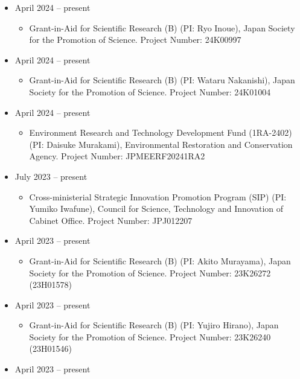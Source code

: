 \documentclass[
]{book}
\providecommand{\tightlist}{%
  \setlength{\itemsep}{0pt}\setlength{\parskip}{0pt}}
\begin{document}
\begin{itemize}
\tightlist
\item
  April 2024 -- present

  \begin{itemize}
  \tightlist
  \item
    Grant-in-Aid for Scientific Research (B) (PI: Ryo Inoue),
    Japan Society for the Promotion of Science.
    Project Number: 24K00997
  \end{itemize}
\item
  April 2024 -- present

  \begin{itemize}
  \tightlist
  \item
    Grant-in-Aid for Scientific Research (B) (PI: Wataru Nakanishi),
    Japan Society for the Promotion of Science.
    Project Number: 24K01004
  \end{itemize}
\item
  April 2024 -- present

  \begin{itemize}
  \tightlist
  \item
    Environment Research and Technology Development Fund (1RA-2402) (PI: Daisuke Murakami),
    Environmental Restoration and Conservation Agency.
    Project Number: JPMEERF20241RA2
  \end{itemize}
\item
  July 2023 -- present

  \begin{itemize}
  \tightlist
  \item
    Cross-ministerial Strategic Innovation Promotion Program (SIP) (PI: Yumiko Iwafune),
    Council for Science, Technology and Innovation of Cabinet Office.
    Project Number: JPJ012207
  \end{itemize}
\item
  April 2023 -- present

  \begin{itemize}
  \tightlist
  \item
    Grant-in-Aid for Scientific Research (B) (PI: Akito Murayama),
    Japan Society for the Promotion of Science.
    Project Number: 23K26272 (23H01578)
  \end{itemize}
\item
  April 2023 -- present

  \begin{itemize}
  \tightlist
  \item
    Grant-in-Aid for Scientific Research (B) (PI: Yujiro Hirano),
    Japan Society for the Promotion of Science.
    Project Number: 23K26240 (23H01546)
  \end{itemize}
\item
  April 2023 -- present


\end{itemize}
\end{document}
